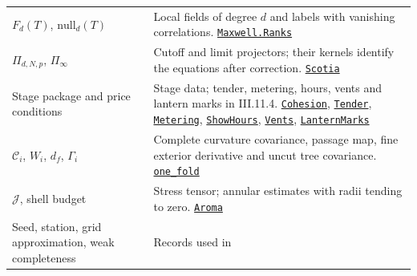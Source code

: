 \documentclass[
  letterpaper,
  11pt]{article}
\begin{document}
{\begin{longtable}[]{@{}
  >{\raggedright\arraybackslash}p{}
  >{\raggedright\arraybackslash}p{}@{}}
\(F_d(T)\), \(\mathrm{null}_d(T)\) & Local fields of degree \(d\) and
labels with vanishing correlations.
\href{https://github.com/yang-mills-group/OpenAI-YM-20261028/blob/3456e5e75cf8d4cd558955a5c7638fba2d68f464/YM/Euclid/Comparator.lean\#L135-L139}{\texttt{Maxwell.Ranks}} \\
\(\Pi_{d,N,p}\), \(\Pi_\infty\) & Cutoff and limit projectors; their
kernels identify the equations after correction.
\href{https://github.com/yang-mills-group/OpenAI-YM-20261028/blob/3456e5e75cf8d4cd558955a5c7638fba2d68f464/YM/MergeProof/Eureka.lean\#L16-L20}{\texttt{Scotia}} \\
Stage package and price conditions & Stage data; tender, metering,
hours, vents and lantern marks in III.11.4.
\href{https://github.com/yang-mills-group/OpenAI-YM-20261028/blob/3456e5e75cf8d4cd558955a5c7638fba2d68f464/YM/Next/RANK/Concord.lean\#L38-L51}{\texttt{Cohesion}},
\href{https://github.com/yang-mills-group/OpenAI-YM-20261028/blob/3456e5e75cf8d4cd558955a5c7638fba2d68f464/YM/PhysicalNext/RANK_COVARIANCE_ATLAS/Consumer.lean\#L71}{\texttt{Tender}},
\href{https://github.com/yang-mills-group/OpenAI-YM-20261028/blob/3456e5e75cf8d4cd558955a5c7638fba2d68f464/YM/Next/RANK/Concord.lean\#L62-L64}{\texttt{Metering}},
\href{https://github.com/yang-mills-group/OpenAI-YM-20261028/blob/3456e5e75cf8d4cd558955a5c7638fba2d68f464/YM/PhysicalNext/AFTERNOON_INTERACTING_RANK_COMPARISON/Pleas.lean\#L21-L26}{\texttt{ShowHours}},
\href{https://github.com/yang-mills-group/OpenAI-YM-20261028/blob/3456e5e75cf8d4cd558955a5c7638fba2d68f464/YM/PhysicalNext/AFTERNOON_INTERACTING_RANK_COMPARISON/Soft/Postsale.lean\#L19-L21}{\texttt{Vents}},
\href{https://github.com/yang-mills-group/OpenAI-YM-20261028/blob/3456e5e75cf8d4cd558955a5c7638fba2d68f464/YM/PhysicalNext/AFTERNOON_INTERACTING_RANK_COMPARISON/Proceed.lean\#L74-L77}{\texttt{LanternMarks}} \\
\(\mathcal C_i\), \(W_i\), \(d_f\), \(\Gamma_i\) & Complete curvature
covariance, passage map, fine exterior derivative and uncut tree
covariance.
\href{https://github.com/yang-mills-group/OpenAI-YM-20261028/blob/3456e5e75cf8d4cd558955a5c7638fba2d68f464/YM/PhysicalNext/RANK_COVARIANCE_ATLAS/Identity.lean\#L198-L213}{\texttt{one\_fold}} \\
\(\mathcal J\), shell budget & Stress tensor; annular estimates with
radii tending to zero.
\href{https://github.com/yang-mills-group/OpenAI-YM-20261028/blob/3456e5e75cf8d4cd558955a5c7638fba2d68f464/YM/MergeProof/West/Ozone.lean\#L16-L19}{\texttt{Aroma}} \\
Seed, station, grid approximation, weak completeness & Records used in

\end{longtable}}
\end{document}
